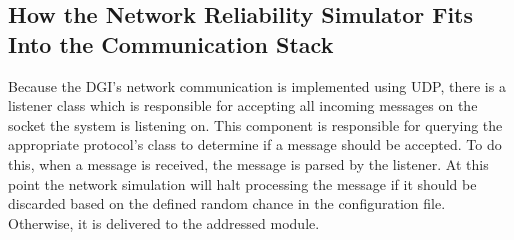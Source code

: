 \subsection{How the Network Reliability Simulator Fits Into the Communication 
Stack}

Because the DGI's network communication is implemented using UDP, there is a 
listener class which is responsible for accepting all incoming messages on the 
socket the system is listening on. This component is responsible for querying 
the appropriate protocol's class to determine
if a message should be accepted. To do this, when a message is received, the 
message is parsed by the listener. At this point the network simulation will 
halt processing the  message if it should be discarded based on the defined 
random chance in the configuration file. Otherwise, it is delivered to the 
addressed module.
